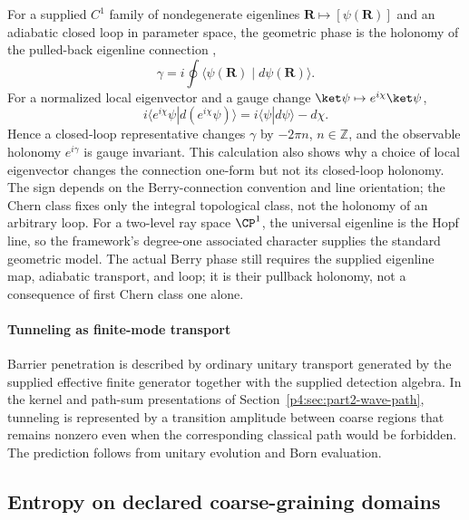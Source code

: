 \documentclass[12pt,a4paper]{article}
\begin{document}
For a supplied \(C^1\) family of nondegenerate eigenlines
\(\mathbf R\mapsto[\psi(\mathbf R)]\) and an adiabatic closed loop in
parameter space, the geometric phase is the holonomy of the pulled-back
eigenline connection \cite{Berry1984},
\begin{equation}
\label{p4:eq:berry}
\gamma=i\oint \langle\psi(\mathbf R)\mid d\psi(\mathbf R)\rangle .
\end{equation}
For a normalized local eigenvector and a gauge change
\(\ket\psi\mapsto e^{i\chi}\ket\psi\),
\[
 i\langle e^{i\chi}\psi|d(e^{i\chi}\psi)\rangle
 =i\langle\psi|d\psi\rangle-d\chi.
\]
Hence a closed-loop representative changes \(\gamma\) by
\(-2\pi n\), \(n\in\mathbb Z\), and the observable holonomy
\(e^{i\gamma}\) is gauge invariant.  This calculation also shows why a
choice of local eigenvector changes the connection one-form but not its
closed-loop holonomy.
The sign depends on the Berry-connection convention and line orientation;
the Chern class fixes only the integral topological class, not the holonomy
of an arbitrary loop.  For a two-level ray space
\(\CP^1\), the universal eigenline is the Hopf line, so the framework's
degree-one associated character supplies the standard geometric model.
The actual Berry phase still requires the supplied eigenline map, adiabatic
transport, and loop; it is their pullback holonomy, not a consequence of
first Chern class one alone.



\paragraph{Tunneling as finite-mode transport}
\label{p4:sec:part2-tunneling}

Barrier penetration is described by ordinary unitary transport generated by the supplied effective finite generator together with the supplied detection algebra.
In the kernel and path-sum presentations of
Section~\ref{p4:sec:part2-wave-path}, tunneling is represented by a
transition amplitude between coarse regions that remains nonzero even when
the corresponding classical path would be forbidden.
The prediction follows from unitary evolution and Born evaluation.




\subsection{Entropy on declared coarse-graining domains}
\label{p4:sec:part3-entropy}
\end{document}

